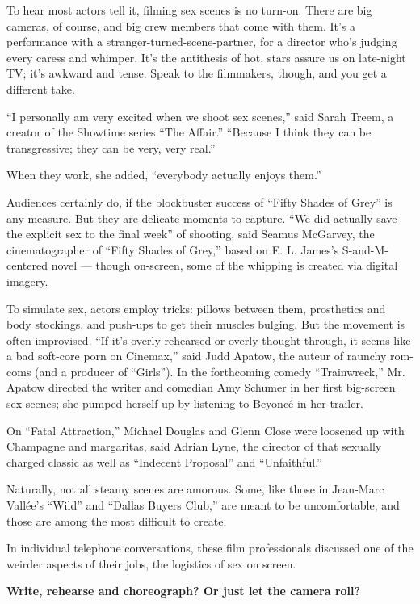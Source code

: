 To hear most actors tell it, filming sex scenes is no turn-on. There are
big cameras, of course, and big crew members that come with them. It's a
performance with a stranger-turned-scene-partner, for a director who's
judging every caress and whimper. It's the antithesis of hot, stars
assure us on late-night TV; it's awkward and tense. Speak to the
filmmakers, though, and you get a different take.

``I personally am very excited when we shoot sex scenes,'' said Sarah
Treem, a creator of the Showtime series ``The Affair.'' ``Because I
think they can be transgressive; they can be very, very real.''

When they work, she added, ``everybody actually enjoys them.''

Audiences certainly do, if the blockbuster success of ``Fifty Shades of
Grey'' is any measure. But they are delicate moments to capture. ``We
did actually save the explicit sex to the final week'' of shooting, said
Seamus McGarvey, the cinematographer of ``Fifty Shades of Grey,'' based
on E. L. James's S-and-M-centered novel --- though on-screen, some of
the whipping is created via digital imagery.

To simulate sex, actors employ tricks: pillows between them, prosthetics
and body stockings, and push-ups to get their muscles bulging. But the
movement is often improvised. ``If it's overly rehearsed or overly
thought through, it seems like a bad soft-core porn on Cinemax,'' said
Judd Apatow, the auteur of raunchy rom-coms (and a producer of
``Girls''). In the forthcoming comedy ``Trainwreck,'' Mr. Apatow
directed the writer and comedian Amy Schumer in her first big-screen sex
scenes; she pumped herself up by listening to Beyoncé in her trailer.

On ``Fatal Attraction,'' Michael Douglas and Glenn Close were loosened
up with Champagne and margaritas, said Adrian Lyne, the director of that
sexually charged classic as well as ``Indecent Proposal'' and
``Unfaithful.''

Naturally, not all steamy scenes are amorous. Some, like those in
Jean-Marc Vallée's ``Wild'' and ``Dallas Buyers Club,'' are meant to be
uncomfortable, and those are among the most difficult to create.

In individual telephone conversations, these film professionals
discussed one of the weirder aspects of their jobs, the logistics of sex
on screen.

\textbf{Write, rehearse and choreograph? Or just let the camera roll?}

